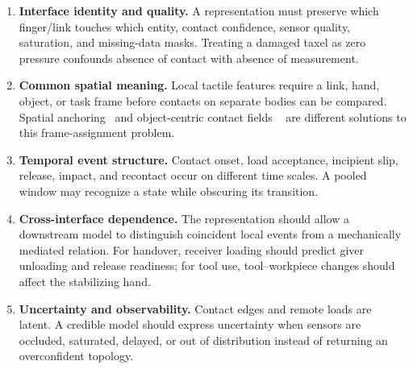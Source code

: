 \begin{enumerate}
  \item \textbf{Interface identity and quality.} A representation must preserve
  which finger/link touches which entity, contact confidence, sensor quality,
  saturation, and missing-data masks. Treating a damaged taxel as zero pressure
  confounds absence of contact with absence of measurement.

  \item \textbf{Common spatial meaning.} Local tactile features require a link,
  hand, object, or task frame before contacts on separate bodies can be compared.
  Spatial anchoring~\cite{huang2025sata} and object-centric contact fields
  ~\cite{higuera2023ncf,ma2026semanticcontact} are different solutions to this
  frame-assignment problem.

  \item \textbf{Temporal event structure.} Contact onset, load acceptance,
  incipient slip, release, impact, and recontact occur on different time scales.
  A pooled window may recognize a state while obscuring its transition.

  \item \textbf{Cross-interface dependence.} The representation should allow a
  downstream model to distinguish coincident local events from a mechanically
  mediated relation. For handover, receiver loading should predict giver
  unloading and release readiness; for tool use, tool--workpiece changes should
  affect the stabilizing hand.

  \item \textbf{Uncertainty and observability.} Contact edges and remote loads are
  latent. A credible model should express uncertainty when sensors are occluded,
  saturated, delayed, or out of distribution instead of returning an
  overconfident topology.
\end{enumerate}

